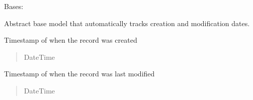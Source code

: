 \documentclass[letterpaper,10pt,english]{sphinxmanual}
\begin{document}
\begin{fulllineitems}
\label{\detokenize{pages_app.models:pages_app.models.base.TimestampedModel}}
\pysigstartsignatures
\pysiglinewithargsret
{}
{\sphinxparamcomma {}}
{}
\pysigstopsignatures
\sphinxAtStartPar
Bases: 

\sphinxAtStartPar
Abstract base model that automatically tracks creation and modification dates.

\begin{fulllineitems}
\label{\detokenize{pages_app.models:pages_app.models.base.TimestampedModel.created_at}}
\pysigstartsignatures
\pysigline
{}
\pysigstopsignatures
\sphinxAtStartPar
Timestamp of when the record was created
\begin{quote}\begin{description}
\sphinxAtStartPar
DateTime

\end{description}\end{quote}

\end{fulllineitems}


\begin{fulllineitems}
\label{\detokenize{pages_app.models:pages_app.models.base.TimestampedModel.updated_at}}
\pysigstartsignatures
\pysigline
{}
\pysigstopsignatures
\sphinxAtStartPar
Timestamp of when the record was last modified
\begin{quote}\begin{description}
\sphinxAtStartPar
DateTime

\end{description}\end{quote}

\end{fulllineitems}



\end{fulllineitems}
\end{document}
